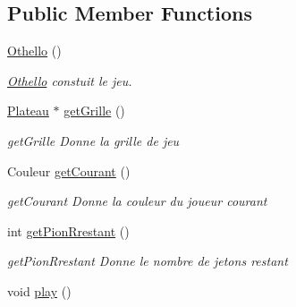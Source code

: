 \subsection*{Public Member Functions}
\begin{DoxyCompactItemize}
\item 
\hypertarget{class_othello_a66e89bf891e08ed03c257c87fb9be524}{}\hyperlink{class_othello_a66e89bf891e08ed03c257c87fb9be524}{Othello} ()\label{class_othello_a66e89bf891e08ed03c257c87fb9be524}

\begin{DoxyCompactList}\small\item\em \hyperlink{class_othello}{Othello} constuit le jeu. \end{DoxyCompactList}\item 
\hyperlink{class_plateau}{Plateau} $\ast$ \hyperlink{class_othello_a0085465c6175a1230f2136078d7004cf}{get\+Grille} ()
\begin{DoxyCompactList}\small\item\em get\+Grille Donne la grille de jeu \end{DoxyCompactList}\item 
Couleur \hyperlink{class_othello_afdd6f9f72d565f9c45506f584c8077cb}{get\+Courant} ()
\begin{DoxyCompactList}\small\item\em get\+Courant Donne la couleur du joueur courant \end{DoxyCompactList}\item 
int \hyperlink{class_othello_a72ee1241f1a2c2d5eccbc3fe0938faa3}{get\+Pion\+Rrestant} ()
\begin{DoxyCompactList}\small\item\em get\+Pion\+Rrestant Donne le nombre de jetons restant \end{DoxyCompactList}\item 
\hypertarget{class_othello_a3376b9dd57d213bcb93ae0ee50c9c994}{}void \hyperlink{class_othello_a3376b9dd57d213bcb93ae0ee50c9c994}{play} ()\label{class_othello_a3376b9dd57d213bcb93ae0ee50c9c994}


\end{DoxyCompactItemize}
